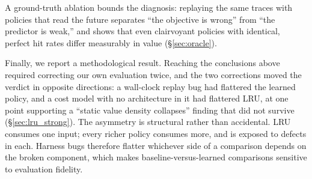 \documentclass[letterpaper,twocolumn,10pt]{article}
\begin{document}
A ground-truth ablation bounds the diagnosis: replaying the same traces with policies that read the future separates ``the objective is wrong'' from ``the predictor is weak,'' and shows that even clairvoyant policies with identical, perfect hit rates differ measurably in value (\S\ref{sec:oracle}).

Finally, we report a methodological result. Reaching the conclusions above required correcting our own evaluation twice, and the two corrections moved the verdict in opposite directions: a wall-clock replay bug had flattered the learned policy, and a cost model with no architecture in it had flattered LRU, at one point supporting a ``static value density collapses'' finding that did not survive (\S\ref{sec:lru_strong}). The asymmetry is structural rather than accidental. LRU consumes one input; every richer policy consumes more, and is exposed to defects in each. Harness bugs therefore flatter whichever side of a comparison depends on the broken component, which makes baseline-versus-learned comparisons sensitive to evaluation fidelity.
\end{document}
